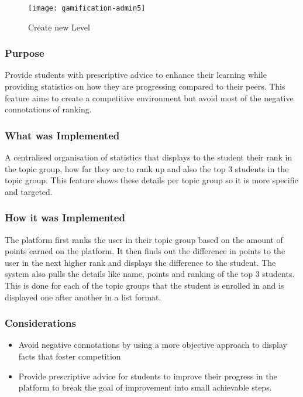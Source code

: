 \begin{figure}[h!]
    \texttt{[image: gamification-admin5]}
    \centering
    \caption{Create new Level}
\end{figure}


\newpage

\subsubsection{Purpose}
Provide students with prescriptive advice to enhance their learning while providing statistics on how they are progressing compared to their peers. This feature aims to create a competitive environment but avoid most of the negative connotations of ranking.

\subsubsection{What was Implemented}
A centralised organisation of statistics that displays to the student their rank in the topic group, how far they are to rank up and also the top 3 students in the topic group. This feature shows these details per topic group so it is more specific and targeted.

\subsubsection{How it was Implemented}
The platform first ranks the user in their topic group based on the amount of points earned on the platform. It then finds out the difference in points to the user in the next higher rank and displays the difference to the student. The system also pulls the details like name, points and ranking of the top 3 students. This is done for each of the topic groups that the student is enrolled in and is displayed one after another in a list format.

\subsubsection{Considerations}
\begin{itemize}
    \item Avoid negative connotations by using a more objective approach to display facts that foster competition
    \item Provide prescriptive advice for students to improve their progress in the platform to break the goal of improvement into small achievable steps.
\end{itemize}








\newpage